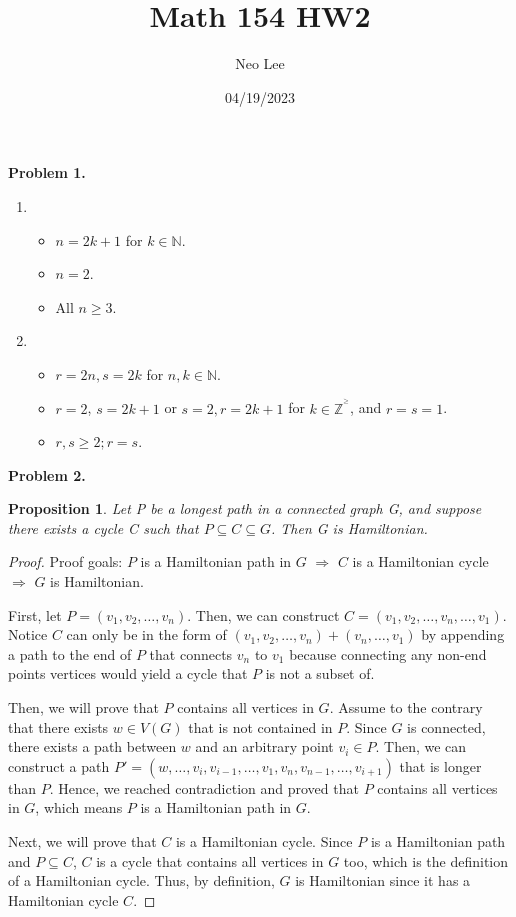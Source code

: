 \documentclass{article}
\title{Math 154 HW2}
\author{Neo Lee}
\date{04/19/2023}
\newtheorem{prop}[thm]{Proposition}
\begin{document}
 

\maketitle 

\textbf{Problem 1.}
\begin{enumerate}[label=(\alph*)]
    \item \begin{itemize}
        \item $n = 2k + 1$ for $k \in \mathbb{N}$.
        \item $n=2$.
        \item All $n \ge 3$.
    \end{itemize}

    \item \begin{itemize}
        \item $r = 2n, s = 2k$ for $n, k \in \mathbb{N}$.
        \item $r = 2$, $s = 2k + 1$ or $s = 2, r = 2k + 1$ for $k\in\mathbb{Z}^{^\ge}$, and $r = s = 1$.
        \item $r, s \ge 2;  r = s$.
    \end{itemize}
\end{enumerate}
\bigbreak

\textbf{Problem 2.}
\begin{prop}
    Let P be a longest path in a connected graph G, and suppose there exists a cycle C such that $P \subseteq C \subseteq G$. Then G is Hamiltonian.
\end{prop}
\begin{proof}
    Proof goals: $P$ is a Hamiltonian path in $G$ $\Rightarrow$ $C$ is a Hamiltonian cycle $\Rightarrow$ $G$ is Hamiltonian.

    First, let $P = (v_1, v_2,\dots, v_n)$. Then, we can construct $C = (v_1, v_2,\dots, v_n, \dots, v_1)$.
    Notice $C$ can only be in the form of $(v_1, v_2,\dots, v_n) + (v_n,\dots, v_1)$ by appending a path to the end of $P$ that connects $v_n$ to $v_1$ because connecting any non-end points vertices would yield a cycle that $P$ is not a subset of.

    Then, we will prove that $P$ contains all vertices in $G$.
    Assume to the contrary that there exists $w \in V(G)$ that is not contained in $P$. 
    Since $G$ is connected, there exists a path between $w$ and an arbitrary point $v_i \in P$.
    Then, we can construct a path $P' = (w, \dots, v_i, v_{i-1}, \dots, v_1, v_n, v_{n-1}, \dots, v_{i+1})$ that is longer than $P$.
    Hence, we reached contradiction and proved that $P$ contains all vertices in $G$, which means $P$ is a Hamiltonian path in $G$.

    Next, we will prove that $C$ is a Hamiltonian cycle. Since $P$ is a Hamiltonian path and $P \subseteq C$, $C$ is a cycle that contains all vertices in $G$ too, which is the definition of a Hamiltonian cycle.
    Thus, by definition, $G$ is Hamiltonian since it has a Hamiltonian cycle $C$.
\end{proof}
\bigbreak
\end{document}

